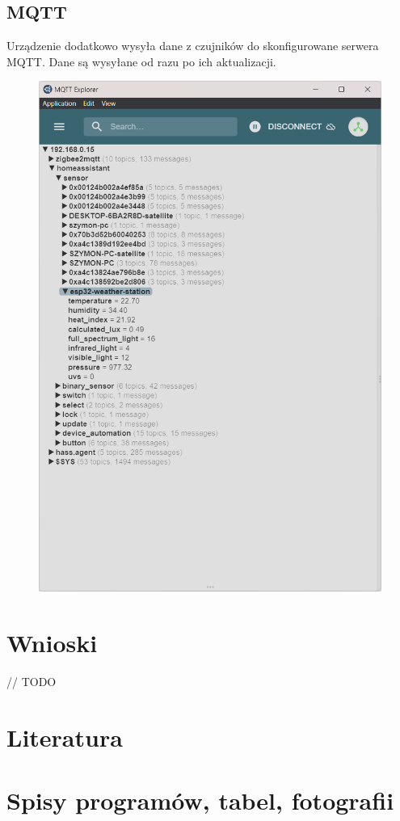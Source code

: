 \documentclass[12pt,a4paper]{article}
\begin{document}
\subsection{MQTT}
Urządzenie dodatkowo wysyła dane z czujników do skonfigurowane serwera MQTT. Dane są wysyłane od razu po ich aktualizacji.
\begin{figure}[H]
    \centering
    \includegraphics[width=\textwidth]{mqtt1.png}
\end{figure}

\section{Wnioski}
// TODO

\section{Literatura}

\printbibliography[heading=none]

\section{Spisy programów, tabel, fotografii}
\listoftables
{}
\end{document}
